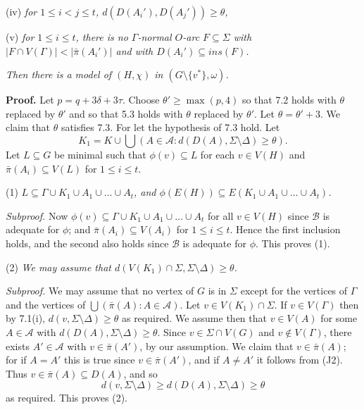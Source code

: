 \hspace*{12pt}(iv) \textit{for $1 \le i < j \le t$, $d(D(A_i'), D(A_j')) \ge \theta$,}

\hspace*{12pt}(v) \textit{for $1 \le i \le t$, there is no $\Gamma$-normal $O$-arc $F \subseteq \Sigma$ with $|F \cap V(\Gamma)| < |\bar{\pi}(A_i')|$ and with $D(A_i') \subseteq ins(F)$.}

\textit{Then there is a model of $(H, \chi)$ in $(G \setminus \{v^*\}, \omega)$.}

\textbf{Proof.} Let $p = q + 3\delta + 3\tau$. Choose $\theta' \ge \max(p, 4)$ so that 7.2 holds with $\theta$ replaced by $\theta'$ and so that 5.3 holds with $\theta$ replaced by $\theta'$. Let $\theta = \theta' + 3$. We claim that $\theta$ satisfies 7.3. For let the hypothesis of 7.3 hold. Let
\begin{equation*}
K_1 = K \cup \bigcup(A \in \mathcal{A} : d(D(A), \Sigma \setminus \Delta) \ge \theta).
\end{equation*}
Let $L \subseteq G$ be minimal such that $\phi(v) \subseteq L$ for each $v \in V(H)$ and $\bar{\pi}(A_i) \subseteq V(L)$ for $1 \le i \le t$.

\hspace*{12pt}(1) \textit{$L \subseteq \Gamma \cup K_1 \cup A_1 \cup \dots \cup A_t$, and $\phi(E(H)) \subseteq E(K_1 \cup A_1 \cup \dots \cup A_t)$.}

\textit{Subproof.} Now $\phi(v) \subseteq \Gamma \cup K_1 \cup A_1 \cup \dots \cup A_t$ for all $v \in V(H)$ since $\mathcal{B}$ is adequate for $\phi$; and $\bar{\pi}(A_i) \subseteq V(A_i)$ for $1 \le i \le t$. Hence the first inclusion holds, and the second also holds since $\mathcal{B}$ is adequate for $\phi$. This proves (1).

\hspace*{12pt}(2) \textit{We may assume that $d(V(K_1) \cap \Sigma, \Sigma \setminus \Delta) \ge \theta$.}

\textit{Subproof.} We may assume that no vertex of $G$ is in $\Sigma$ except for the vertices of $\Gamma$ and the vertices of $\bigcup(\bar{\pi}(A) : A \in \mathcal{A})$. Let $v \in V(K_1) \cap \Sigma$. If $v \in V(\Gamma)$ then by 7.1(i), $d(v, \Sigma \setminus \Delta) \ge \theta$ as required. We assume then that $v \in V(A)$ for some $A \in \mathcal{A}$ with $d(D(A), \Sigma \setminus \Delta) \ge \theta$. Since $v \in \Sigma \cap V(G)$ and $v \notin V(\Gamma)$, there exists $A' \in \mathcal{A}$ with $v \in \bar{\pi}(A')$, by our assumption. We claim that $v \in \bar{\pi}(A)$; for if $A = A'$ this is true since $v \in \bar{\pi}(A')$, and if $A \ne A'$ it follows from (J2). Thus $v \in \bar{\pi}(A) \subseteq D(A)$, and so
\begin{equation*}
d(v, \Sigma \setminus \Delta) \ge d(D(A), \Sigma \setminus \Delta) \ge \theta
\end{equation*}
as required. This proves (2).

